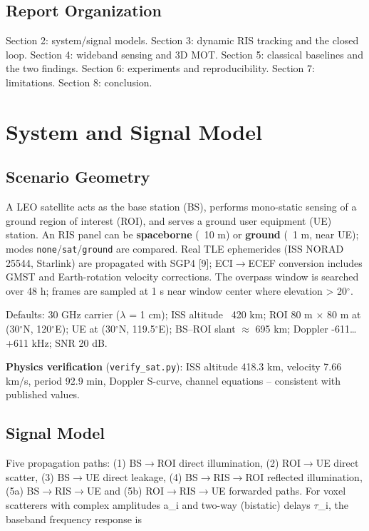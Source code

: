 \documentclass[11pt]{article}
\begin{document}
\subsection{Report Organization}

Section 2: system/signal models. Section 3: dynamic RIS tracking and the closed loop. Section 4: wideband sensing and 3D MOT. Section 5: classical baselines and the two findings. Section 6: experiments and reproducibility. Section 7: limitations. Section 8: conclusion.


\section{System and Signal Model}

\subsection{Scenario Geometry}

A LEO satellite acts as the base station (BS), performs mono-static sensing of a ground region of interest (ROI), and serves a ground user equipment (UE) station. An RIS panel can be \textbf{spaceborne} (~10 m) or \textbf{ground} (~1 m, near UE); modes \texttt{none}/\texttt{sat}/\texttt{ground} are compared. Real TLE ephemerides (ISS NORAD 25544, Starlink) are propagated with SGP4 [9]; ECI$\rightarrow$ECEF conversion includes GMST and Earth-rotation velocity corrections. The overpass window is searched over 48 h; frames are sampled at 1 s near window center where elevation > 20$^\circ$.

Defaults: 30 GHz carrier ($\lambda$ = 1 cm); ISS altitude ~420 km; ROI 80 m $\times$ 80 m at (30$^\circ$N, 120$^\circ$E); UE at (30$^\circ$N, 119.5$^\circ$E); BS--ROI slant $\approx$ 695 km; Doppler -611\ldots+611 kHz; SNR 20 dB.

\textbf{Physics verification} (\texttt{verify\_sat.py}): ISS altitude 418.3 km, velocity 7.66 km/s, period 92.9 min, Doppler S-curve, channel equations -- consistent with published values.

\subsection{Signal Model}

Five propagation paths: (1) BS$\rightarrow$ROI direct illumination, (2) ROI$\rightarrow$UE direct scatter, (3) BS$\rightarrow$UE direct leakage, (4) BS$\rightarrow$RIS$\rightarrow$ROI reflected illumination, (5a) BS$\rightarrow$RIS$\rightarrow$UE and (5b) ROI$\rightarrow$RIS$\rightarrow$UE forwarded paths. For voxel scatterers with complex amplitudes a\_i and two-way (bistatic) delays $\tau$\_i, the baseband frequency response is
\end{document}
